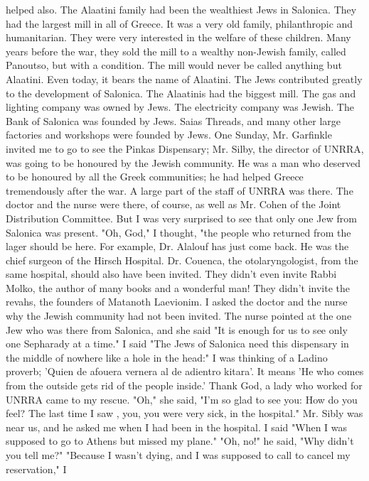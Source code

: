 helped also. 
The Alaatini family had been the wealthiest Jews in Salonica. They had the largest 
mill in all of Greece. It was a very old family, philanthropic and humanitarian. They 
were very interested in the welfare of these children. Many years before the war, they 
sold the mill to a wealthy non-Jewish family, called Panoutso, but with a condition. 
The mill would never be called anything but Alaatini. Even today, it bears the name 
of Alaatini. 
The Jews contributed greatly to the development of Salonica. The Alaatinis had 
the biggest mill. The gas and lighting company was owned by Jews. The electricity 
company was Jewish. The Bank of Salonica was founded by Jews. Saias Threads, and many 
other large factories and workshops were founded by Jews. 
One Sunday, Mr. Garfinkle invited me to go to see the Pinkas Dispensary; Mr. Silby, 
the director of UNRRA, was going to be honoured by the Jewish community. He was a man who deserved to be honoured by all the Greek communities; he had helped Greece tremendously after the war. 
A large part of the staff of UNRRA was there. The doctor and the nurse were there, 
of course, as well as Mr. Cohen of the Joint Distribution Committee. But I was very 
surprised to see that only one Jew from Salonica was present. 
"Oh, God," I thought, "the people who returned from the lager should be here. For 
example, Dr. Alalouf has just come back. He was the chief surgeon of the Hirsch Hospital. Dr. Couenca, the otolaryngologist, from the same hospital, should also have 
been invited. They didn't even invite Rabbi Molko, the author of many books and a 
wonderful man! They didn't invite the revahs, the founders of Matanoth Laevionim. 
I asked the doctor and the nurse why the Jewish community had not been invited. The nurse pointed at the one Jew who was there from Salonica, and she said "It is
enough for us to see only one Sepharady at a time." 
I said "The Jews of Salonica need this dispensary in the middle of nowhere like 
a hole in the head:" I was thinking of a Ladino proverb; 'Quien de afouera vernera 
al de adientro kitara'. It means 'He who comes from the outside gets rid of the people 
inside.' Thank God, a lady who worked for UNRRA came to my rescue. 
"Oh," she said, "I'm so glad to see you: How do you feel? The last time I saw , 
you, you were very sick, in the hospital." 
Mr. Sibly was near us, and he asked me when I had been in the hospital. 
I said "When I was supposed to go to Athens but missed my plane." 
"Oh, no!" he said, "Why didn't you tell me?" 
"Because I wasn't dying, and I was supposed to call to cancel my reservation," I
